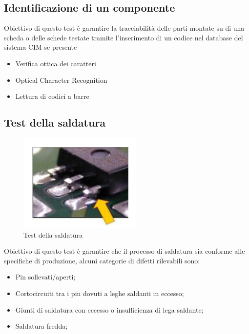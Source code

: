 \subsection{Identificazione di un componente}
Obiettivo di questo test è garantire la tracciabilità delle parti montate su di una scheda o delle schede
testate tramite l’inserimento di un codice nel database del sistema CIM se presente
\begin{itemize}
\item Verifica ottica dei caratteri
\item Optical Character Recognition
\item Lettura di codici a barre
\end{itemize}

\subsection{Test della saldatura}

\begin{figure}[!ht]
\centering
\includegraphics[width=.4\textwidth]{img/saldatura.png}
\caption{Test della saldatura}
\label{fig:presenza}
\end{figure}

Obiettivo di questo test è garantire che il processo di saldatura sia conforme alle specifiche di produzione,
alcuni categorie di difetti rilevabili sono:
\begin{itemize}
\item Pin sollevati/aperti;
\item Cortocircuiti tra i pin dovuti a leghe saldanti in eccesso;
\item Giunti di saldatura con eccesso o insufficienza di lega saldante;
\item Saldatura fredda;
\end{itemize}

